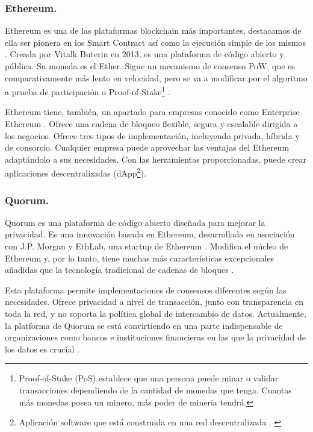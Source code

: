 \subsubsection*{Ethereum.}

Ethereum es una de las plataformas blockchain más importantes, destacamos de ella ser pionera en los Smart Contract así 
como la ejecución simple de los mismos \cite{top-blockchain-platforms-app}. Creada por Vitalk Buterin en 2013, es una 
plataforma de código abierto y pública. Su moneda es el Ether. Sigue un mecanismo de consenso PoW, que es 
comparativamente más lento en velocidad, pero se va a modificar por el algoritmo a prueba de participación o 
Proof-of-Stake\footnote{Proof-of-Stake (PoS) establece que una persona puede minar o validar transacciones dependiendo 
de la cantidad de monedas que tenga. Cuantas más monedas posea un minero, más poder de mineria tendrá.\label{fnlabel}} 
\cite{proof-of-stake}.

\vspace{5mm}

\noindent Ethereum tiene, también, un apartado para empresas conocido como Enterprise Ethereum 
\cite{top-blockchain-platforms}. Ofrece una cadena de bloqueo flexible, segura y escalable dirigida a los negocios. 
Ofrece tres tipos de implementación, incluyendo privada, híbrida y de consorcio. Cualquier empresa puede aprovechar 
las ventajas del Ethereum adaptándolo a sus necesidades. Con las herramientas proporcionadas, puede crear aplicaciones 
descentralizadas (dApp\footnote{Aplicación software que está construida en una red descentralizada \cite{what-is-dapp}.
\label{fnlabel}}). 

\subsubsection*{Quorum.}

Quorum es una plataforma de código abierto diseñada para mejorar la privacidad. Es una innovación basada en Ethereum, 
desarrollada en asociación con J.P. Morgan y EthLab, una startup de Ethereum . Modifica el núcleo de Ethereum y, por lo 
tanto, tiene muchas más características excepcionales añadidas que la tecnología tradicional de cadenas de bloques 
\cite{top-blockchain-platforms-app}. 

\vspace{5mm}

\noindent Esta plataforma permite implementaciones de consensos diferentes según las necesidades. Ofrece privacidad a 
nivel de transacción, junto con transparencia en toda la red, y no soporta la política global de intercambio de datos. 
Actualmente, la platforma de Quorum se está convirtiendo en una parte indispensable de organizaciones como bancos e 
instituciones financieras en las que la privacidad de los datos es crucial \cite{top-blockchain-platforms-app}.

